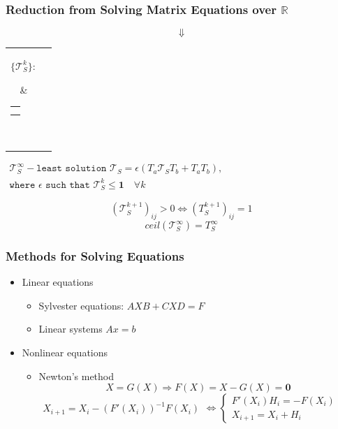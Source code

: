 \documentclass[xcolor=table]{beamer}
\begin{document}
\begin{frame}[fragile]
  \transwipe[direction=90]
  \frametitle{Reduction from Solving Matrix Equations over $\mathbb{R}$}
  
    $$\Downarrow$$
    \centering
    \begin{tabular}{cl}
    \parbox{0.07\linewidth}{
    $\{ \mathcal{T}_S^k \}:$
    }
    & \begin{tabular}{l}
    $\mathcal{T}_S^0 = \mathbf{0}$ \\
    $\mathcal{T}_S^{k+1} = \epsilon(T_a \mathcal{T}_S^k T_b + T_a T_b)$
    \end{tabular} \\
    \end{tabular}

    \vspace{20pt}
    \(
    \left.
    \begin{array}{c}
    \mathcal{T}_S^{\infty} - \texttt{least solution } \mathcal{T}_S = \epsilon(T_a \mathcal{T}_S T_b + T_a T_b), \\
    \texttt{where } \epsilon \texttt{ such that } \mathcal{T}_{S}^{k} \leq \textbf{1} \quad \forall k
    \end{array}
    \right.
    \)
  
  \pause
  
  $$(\mathcal{T}_S^{k+1})_{ij} > 0 \iff (T_S^{k+1})_{ij} = 1$$
  $$ceil(\mathcal{T}_S^{\infty}) = T_S^{\infty}$$
\end{frame}

\begin{frame}[fragile]
  \transwipe[direction=90]
  \frametitle{Methods for Solving Equations}
 
\begin{itemize}
    \item Linear equations
    \begin{itemize}
        \item Sylvester equations: $AXB + CXD = F$
        \item Linear systems $Ax=b$
    \end{itemize}
    \item Nonlinear equations
    \begin{itemize}
        \item Newton's method \\
                $$X = G(X) \Rightarrow F(X) = X - G(X) = \mathbf{0}$$
                \(
                \left.
                \begin{array}{l}
                X_{i+1} = X_i - (F'(X_i))^{-1}F(X_i)
                \end{array}
                \right.
                \iff
                \left\{
                \begin{array}{l}
                F'(X_i)H_i = - F(X_i) \\
                X_{i+1} = X_i + H_i
                \end{array}
                \right.
                \)
    \end{itemize}
\end{itemize}
\end{frame}
\end{document}
